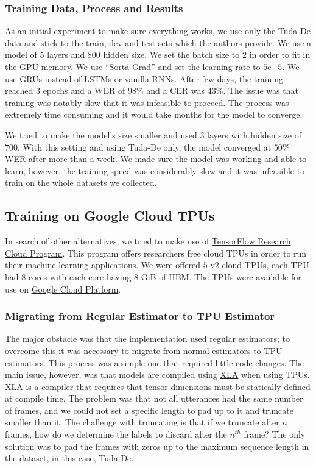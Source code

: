 \subsubsection{Training Data, Process and Results}
\label{meth:s3_sub1_subsub2}

As an initial experiment to make sure everything works, we use only the Tuda-De data and stick to the train, dev and test sets which the authors provide. We use a model of $5$ layers and $800$ hidden size. We set the batch size to $2$ in order to fit in the GPU memory. We use \enquote{Sorta Grad} and set the learning rate to $5\mathrm{e}{-5}$. We use \ac{GRU}s instead of \ac{LSTM}s or vanilla \ac{RNN}s. After few days, the training reached $3$ epochs and a \ac{WER} of $98\%$ and a \ac{CER} was $43\%$. The issue was that training was notably slow that it was infeasible to proceed. The process was extremely time consuming and it would take months for the model to converge. 

We tried to make the model's size smaller and used $3$ layers with hidden size of $700$. With this setting and using Tuda-De only, the model converged at $50\%$ \ac{WER} after more than a week. We made sure the model was working and able to learn, however, the training speed was considerably slow and it was infeasible to train on the whole datasets we collected.

\subsection{Training on Google Cloud TPUs}
\label{meth:s3_sub2}

In search of other alternatives, we tried to make use of \href{https://www.tensorflow.org/tfrc}{TensorFlow Research Cloud Program}. This program offers researchers free cloud \ac{TPU}s in order to run their machine learning applications. We were offered $5$ v2 cloud \ac{TPU}s, each \ac{TPU} had $8$ cores with each core having $8$ GiB of \ac{HBM}. The \ac{TPU}s were available for use on \href{https://cloud.google.com/}{Google Cloud Platform}. 

\subsubsection{Migrating from Regular Estimator to TPU Estimator}
\label{meth:s3_sub2_subsub1}

The major obstacle was that the implementation used regular estimators; to overcome this it was necessary to migrate from normal estimators to \ac{TPU} estimators. This process was a simple one that required little code changes. The main issue, however, was that models are compiled using \href{https://www.tensorflow.org/xla/}{\ac{XLA}} when using \ac{TPU}s. \ac{XLA} is a compiler that requires that tensor dimensions must be statically defined at compile time. The problem was that not all utterances had the same number of frames, and we could not set a specific length to pad up to it and truncate smaller than it. The challenge with truncating is that if we truncate after $n$ frames, how do we determine the labels to discard after the $n^{th}$ frame? The only solution was to pad the frames with zeros up to the maximum sequence length in the dataset, in this case, Tuda-De. 

